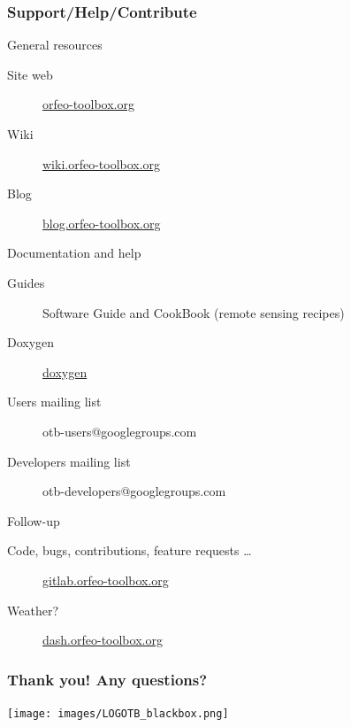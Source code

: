 \documentclass[8pt]{beamer}
\begin{document}
\begin{frame}
\frametitle{Support/Help/Contribute}
\vspace{-0.2cm}
\begin{block}{General resources}
\vspace{-0.2cm}
\begin{description}
\item[Site web] \href{http://www.orfeo-toolbox.org}{orfeo-toolbox.org}
\item[Wiki] \href{http://wiki.orfeo-toolbox.org}{wiki.orfeo-toolbox.org}
\item[Blog] \href{http://blog.orfeo-toolbox.org}{blog.orfeo-toolbox.org}
\end{description}
\end{block}
\vspace{-0.2cm}
\begin{block}{Documentation and help}
\vspace{-0.2cm}
\begin{description}
\item[Guides] Software Guide and CookBook (remote sensing recipes)
\item[Doxygen] \href{http://www.orfeo-toolbox.org/doxygen}{doxygen}
\item[Users mailing list] otb-users@googlegroups.com
\item[Developers mailing list] otb-developers@googlegroups.com
\end{description}
\end{block}
\vspace{-0.2cm}
\begin{block}{Follow-up}
\vspace{-0.2cm}
\begin{description}
\item[Code, bugs, contributions, feature requests \ldots] \href{https://gitlab.orfeo-toolbox.org/orfeotoolbox/otb}{gitlab.orfeo-toolbox.org}
\item[Weather?] \href{http://dash.orfeo-toolbox.org}{dash.orfeo-toolbox.org}
\end{description}
\end{block}
\end{frame}

\begin{frame}
\frametitle{Thank you! Any questions?}
\begin{minipage}[t][6cm][t]{\textwidth}
\begin{center}
\texttt{[image: images/LOGOTB\_blackbox.png]}
\end{center}
\end{minipage}
\end{frame}
\end{document}
